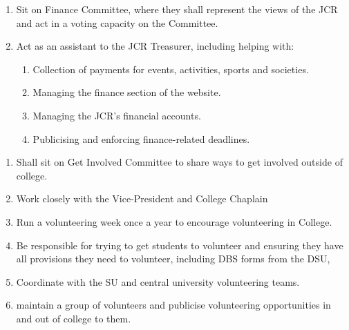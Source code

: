 \begin{enumerate}
    \item Sit on Finance Committee, where they shall represent the views of the JCR and act in a voting capacity on the Committee.
    \item Act as an assistant to the JCR Treasurer, including helping with:
    \begin{enumerate}
        
        \item Collection of payments for events, activities, sports and societies.
        \item Managing the finance section of the website.
        \item Managing the JCR’s financial accounts.
        \item Publicising and enforcing finance-related deadlines.
    \end{enumerate}
\end{enumerate}

\begin{enumerate}
    \item Shall sit on Get Involved Committee to share ways to get involved outside of college. 
    \item Work closely with the Vice-President and College Chaplain 
    \item Run a volunteering week once a year to encourage volunteering in College. 
    \item Be responsible for trying to get students to volunteer and ensuring they have all provisions they need to volunteer, including DBS forms from the DSU,
    \item Coordinate with the SU and central university volunteering teams. 
    \item maintain a group of volunteers and publicise volunteering opportunities in and out of college to them. 
\end{enumerate}

